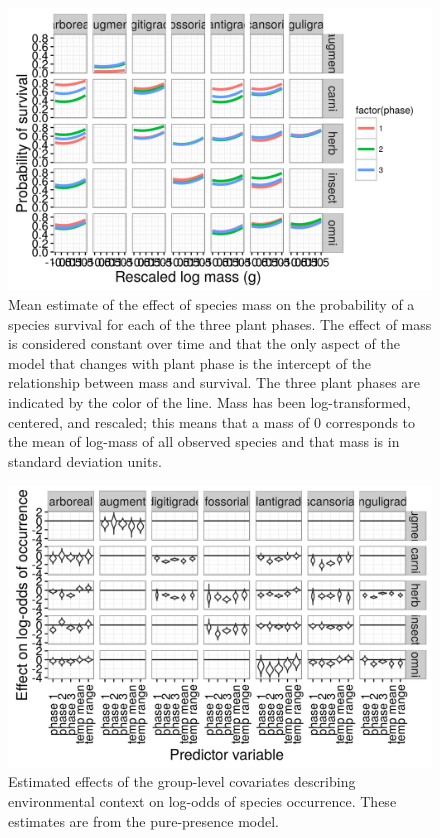 \documentclass[12pt,letterpaper]{article}
\begin{document}
\begin{figure}[ht]
  \centering
  \includegraphics[width=\textwidth,height=0.8\textheight,keepaspectratio=true]{figure/mass_on_surv_bd}
  \caption[Effect of mass on probability of species survival as estimated from the birth-death model]{Mean estimate of the effect of species mass on the probability of a species survival for each of the three plant phases. The effect of mass is considered constant over time and that the only aspect of the model that changes with plant phase is the intercept of the relationship between mass and survival. The three plant phases are indicated by the color of the line. Mass has been log-transformed, centered, and rescaled; this means that a mass of 0 corresponds to the mean of log-mass of all observed species and that mass is in standard deviation units.}
  \label{fig:mass_survival}
\end{figure}

\begin{figure}[ht]
  \centering
  \includegraphics[width=\textwidth,height=0.8\textheight,keepaspectratio=true]{figure/group_on_ecotype}
  \caption[Effects of group-level covariates on log-odds of ecotype occurrence as estimated from the the pure-presence model]{Estimated effects of the group-level covariates describing environmental context on log-odds of species occurrence. These estimates are from the pure-presence model.} 
  \label{fig:group_pure_presence}
\end{figure}
\end{document}
